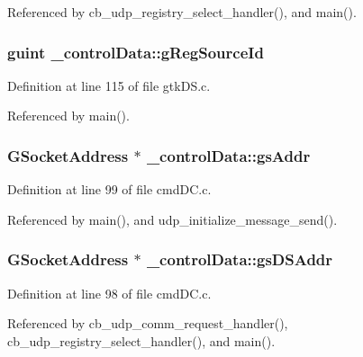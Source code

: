 Referenced by cb\+\_\+udp\+\_\+registry\+\_\+select\+\_\+handler(), and main().

\hypertarget{struct__control_data_a96ccde7cdcba6f4f52f472f95ddaf782}{
\subsubsection[{g\+Reg\+Source\+Id}]{\setlength{\rightskip}{0pt plus 5cm}guint \+\_\+control\+Data\+::g\+Reg\+Source\+Id}}\label{struct__control_data_a96ccde7cdcba6f4f52f472f95ddaf782}


Definition at line 115 of file gtk\+D\+S.\+c.



Referenced by main().

\hypertarget{struct__control_data_a8a43853386551af4c746fd4b882eb2bf}{
\subsubsection[{gs\+Addr}]{\setlength{\rightskip}{0pt plus 5cm}G\+Socket\+Address $\ast$ \+\_\+control\+Data\+::gs\+Addr}}\label{struct__control_data_a8a43853386551af4c746fd4b882eb2bf}


Definition at line 99 of file cmd\+D\+C.\+c.



Referenced by main(), and udp\+\_\+initialize\+\_\+message\+\_\+send().

\hypertarget{struct__control_data_a11c618822b208569a5d28206407326d5}{
\subsubsection[{gs\+D\+S\+Addr}]{\setlength{\rightskip}{0pt plus 5cm}G\+Socket\+Address $\ast$ \+\_\+control\+Data\+::gs\+D\+S\+Addr}}\label{struct__control_data_a11c618822b208569a5d28206407326d5}


Definition at line 98 of file cmd\+D\+C.\+c.



Referenced by cb\+\_\+udp\+\_\+comm\+\_\+request\+\_\+handler(), cb\+\_\+udp\+\_\+registry\+\_\+select\+\_\+handler(), and main().

